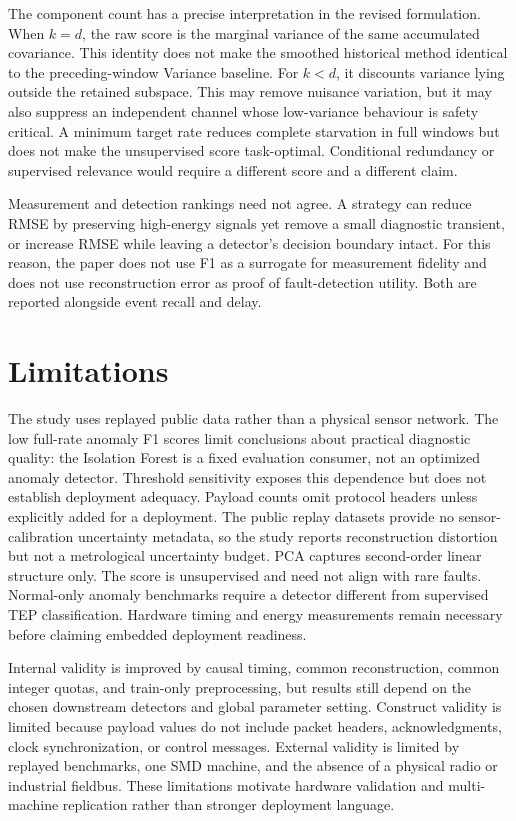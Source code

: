\documentclass[pdflatex,sn-vancouver-num]{sn-jnl}
\theoremstyle{thmstyleone}
\begin{document}
The component count has a precise interpretation in the revised formulation.
When $k=d$, the raw score is the marginal variance of the same accumulated
covariance. This identity does not make the smoothed historical method identical
to the preceding-window Variance baseline.
For $k<d$, it discounts variance lying outside the retained subspace. This may
remove nuisance variation, but it may also suppress an independent channel
whose low-variance behaviour is safety critical. A minimum target rate reduces complete
starvation in full windows but does not make the unsupervised score task-optimal. Conditional
redundancy or supervised relevance would require a different score and a
different claim.

Measurement and detection rankings need not agree. A strategy can reduce RMSE
by preserving high-energy signals yet remove a small diagnostic transient, or
increase RMSE while leaving a detector's decision boundary intact. For this
reason, the paper does not use F1 as a surrogate for measurement fidelity and
does not use reconstruction error as proof of fault-detection utility. Both are
reported alongside event recall and delay.

\section{Limitations}

The study uses replayed public data rather than a physical sensor network.
The low full-rate anomaly F1 scores limit conclusions about practical diagnostic
quality: the Isolation Forest is a fixed evaluation consumer, not an optimized
anomaly detector. Threshold sensitivity exposes this dependence but does not
establish deployment adequacy.
Payload counts omit protocol headers unless explicitly added for a deployment.
The public replay datasets provide no sensor-calibration uncertainty metadata,
so the study reports reconstruction distortion but not a metrological
uncertainty budget.
PCA captures second-order linear structure only. The score is unsupervised and
need not align with rare faults. Normal-only anomaly benchmarks require a
detector different from supervised TEP classification. Hardware timing and
energy measurements remain necessary before claiming embedded deployment
readiness.

Internal validity is improved by causal timing, common reconstruction, common
integer quotas, and train-only preprocessing, but results still depend on the
chosen downstream detectors and global parameter setting. Construct validity
is limited because payload values do not include packet headers, acknowledgments,
clock synchronization, or control messages. External validity is limited by
replayed benchmarks, one SMD machine, and the absence of a physical radio or
industrial fieldbus. These limitations motivate hardware validation and
multi-machine replication rather than stronger deployment language.
\end{document}
